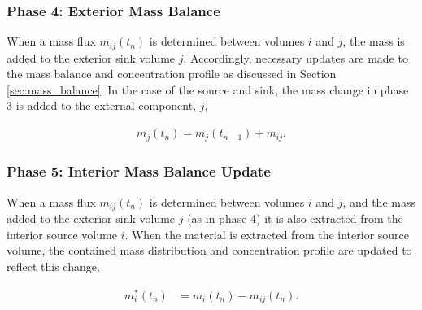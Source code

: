 \subsubsection{Phase 4: Exterior Mass Balance}

When a mass flux $m_{ij}(t_n)$ is determined between volumes $i$ and $j$, the
mass is added to the exterior sink volume $j$. Accordingly, necessary updates
are made to the mass balance and concentration profile as discussed in Section
\ref{sec:mass_balance}. In the case of the source and sink, the mass change in
phase 3 is added to the external component, $j$,

\begin{align}
 m_j(t_n) = m_j(t_{n-1}) + m_{ij}.
\end{align}

\subsubsection{Phase 5: Interior Mass Balance Update}

When a mass flux $m_{ij}(t_n)$ is determined between volumes $i$ and $j$, and
the mass added to the exterior sink volume $j$ (as in phase 4) it is also
extracted from the interior source volume $i$.  When the material is extracted
from the interior source volume, the contained mass distribution and
concentration profile are updated to reflect this change,

\begin{align}
  m_{i}^*(t_n) &= m_i(t_n) - m_{ij}(t_n).
\end{align}


